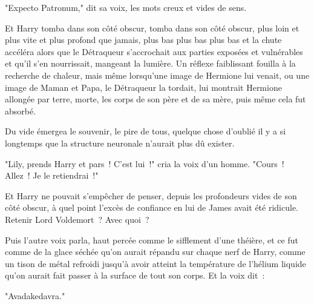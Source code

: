 "Expecto Patronum," dit sa voix, les mots creux et vides de sens.

Et Harry tomba dans son côté obscur, tomba dans son côté obscur, plus loin et plus vite et plus profond que jamais, plus bas plus bas plus bas et la chute accéléra alors que le Détraqueur s'accrochait aux parties exposées et vulnérables et qu'il s'en nourrissait, mangeant la lumière. Un réflexe faiblissant fouilla à la recherche de chaleur, mais même lorsqu'une image de Hermione lui venait, ou une image de Maman et Papa, le Détraqueur la tordait, lui montrait Hermione allongée par terre, morte, les corps de son père et de sa mère, puis même cela fut absorbé.

Du vide émergea le souvenir, le pire de tous, quelque chose d'oublié il y a si longtemps que la structure neuronale n'aurait plus dû exister.
\begin{em}
"Lily, prends Harry et pars~! C'est lui~!" cria la voix d'un homme. "Cours~! Allez~! Je le retiendrai~!"

Et Harry ne pouvait s'empêcher de penser, depuis les profondeurs vides de son côté obscur, à quel point l'excès de confiance en lui de James avait été ridicule. Retenir Lord Voldemort~? Avec quoi~?

Puis l'autre voix parla, haut percée comme le sifflement d'une théière, et ce fut comme de la glace séchée qu'on aurait répandu sur chaque nerf de Harry, comme un tison de métal refroidi jusqu'à avoir atteint la température de l'hélium liquide qu'on aurait fait passer à la surface de tout son corps. Et la voix dit~:

"Avadakedavra."
\end{em}

